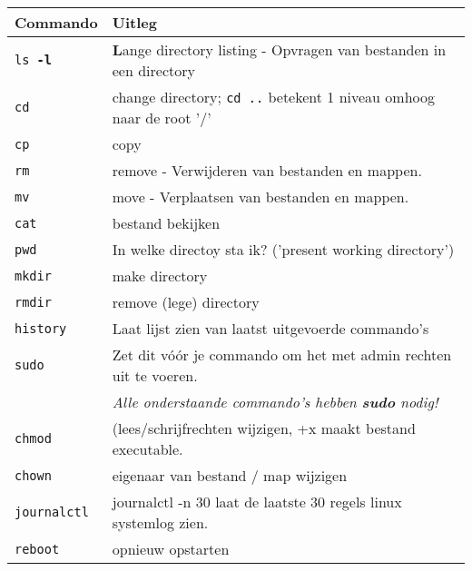 	\begin{tabular}{|l|l|}
		\hline
		Commando & Uitleg \\ \hline
		\texttt{ls \textbf{-l}} & \textbf{L}ange directory listing - Opvragen van bestanden in een directory  \\ \hline
		\texttt{cd} & change directory; \texttt{cd ..} betekent 1 niveau omhoog naar de root '/' \\ \hline
	    \texttt{cp} & copy \\ \hline
	    \texttt{rm} & remove - Verwijderen van bestanden en mappen. \\ \hline
	    \texttt{mv} & move - Verplaatsen van bestanden en mappen. \\ \hline
	    \texttt{cat} & bestand bekijken \\ \hline
	    \texttt{pwd} & In welke directoy sta ik? ('present working directory') \\ \hline
	    \texttt{mkdir} & make directory \\ \hline
		\texttt{rmdir} & remove (lege) directory \\ \hline
	    \texttt{history} & Laat lijst zien van laatst uitgevoerde commando's \\ \hline
	    \texttt{sudo} & Zet dit vóór je commando om het met admin rechten uit te voeren.\\
	    ~ & \emph{Alle onderstaande commando's hebben \textbf{sudo} nodig!} \\ \hline
	    \texttt{chmod} & (lees/schrijfrechten wijzigen, +x maakt bestand executable. \\ \hline
	    \texttt{chown} & eigenaar van bestand / map wijzigen \\ \hline
	    \texttt{journalctl} & journalctl -n 30 laat de laatste 30 regels linux systemlog zien. \\ \hline
	    \texttt{reboot} & opnieuw opstarten \\ \hline
	\end{tabular}
